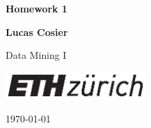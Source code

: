 \documentclass[10pt, a4paper]{article}
\newcommand\course{Data Mining I}                      %
\begin{document}
\begin{titlepage}
    \begin{center}
        \vspace*{3cm}
            
        \Huge
        \textbf{Homework 1}
        
            
        \vspace{1.5cm}
        \Large
            
        \textbf{Lucas Cosier}                      %
        
            
        \vfill
        
        \course \
            
        \vspace{1cm}
            
        \includegraphics[width=0.4\textwidth]{eth_logo_kurz_pos.eps}
        \\
        
        \Large
        
        \today
            
    \end{center}
\end{titlepage}

\end{document}
